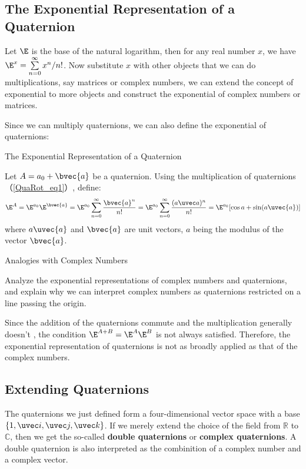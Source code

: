 \subsection{The Exponential Representation of a Quaternion}

Let $\E$ is the base of the natural logarithm, then for any real number $x$, we have $\E^x = \sum^\infty\limits_{n=0} x^n / n!$. Now substitute $x$ with other objects that we can do multiplications, say matrices or complex numbers, we can extend the concept of exponential to more objects and construct the exponential of complex numbers or matrices. 

Since we can multiply quaternions, we can also define the exponential of quaternions: 

\begin{definition}{The Exponential Representation of a Quaternion}

Let $A=a_0+\bvec{a}$ be a quaternion. Using the multiplication of quaternions（\autoref{QuaRot_eq1}）, define: 
\begin{equation}
\E^A=\E^{a_0}\E^{\bvec{a}}=\E^{a_0}\sum^\infty\limits_{n=0}\frac{\bvec{a}^n}{n!}=\E^{a_0}\sum^\infty\limits_{n=0}\frac{(a \uvec a)^n}{n!}=\E^{a_0}[\cos{a}+\sin({a}\uvec{a})]
\end{equation}
where $a\uvec{a}$ and $\bvec{a}$ are unit vectors, $a$ being the modulus of the vector $\bvec{a}$. 
\end{definition}

\begin{exercise}{Analogies with Complex Numbers}

Analyze the exponential representations of complex numbers and quaternions, and explain why we can interpret complex numbers as quaternions restricted on a line passing the origin. 

\end{exercise}

Since the addition of the quaternions commute and the multiplication generally doesn't , the condition $\E^{A+B} = \E^A \E^B$ is not always satisfied. Therefore, the exponential representation of quaternions is not as broadly applied as that of the complex numbers. 

\subsection{Extending Quaternions}

The quaternions we just defined form a four-dimensional vector space with a base $\{1, \uvec i, \uvec j, \uvec k\}$. If we merely extend the choice of the field from $\mathbb{R}$ to $\mathbb{C}$, then we get the so-called \textbf{double quaternions} or \textbf{complex quaternions}. A double quaternion is also interpreted as the combinition of a complex number and a complex vector. 

